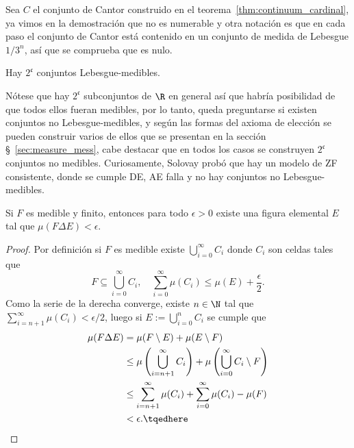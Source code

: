 \begin{exn}
	Sea $C$ el conjunto de Cantor construido en el teorema~\ref{thm:continuum_cardinal}, ya vimos en la demostración que no es numerable
	y otra notación es que en cada paso el conjunto de Cantor está contenido en un conjunto de medida de Lebesgue $1/3^n$, así que se comprueba que es nulo.
\end{exn}
\begin{cor}
	Hay $2^{\mathfrak{c}}$ conjuntos Lebesgue-medibles.
\end{cor}

Nótese que hay $2^{\mathfrak{c}}$ subconjuntos de $\R$ en general así que habría posibilidad de que todos ellos fueran medibles,
por lo tanto, queda preguntarse si existen conjuntos no Lebesgue-medibles, y según las formas del axioma de elección se pueden construir varios de ellos
que se presentan en la sección \S~\ref{sec:measure_mess}, cabe destacar que en todos los casos se construyen $2^{\mathfrak{c}}$ conjuntos no medibles.
Curiosamente, Solovay probó que hay un modelo de ZF consistente, donde se cumple DE, AE falla y no hay conjuntos no Lebesgue-medibles.

\begin{thmi}
	Si $F$ es medible y finito, entonces para todo $\epsilon > 0$ existe una figura elemental $E$ tal que $\mu(F\Delta E) < \epsilon$.
\end{thmi}
\begin{proof}
	Por definición si $F$ es medible existe $\bigcup_{i=0}^\infty C_i$ donde $C_i$ son celdas tales que
	$$ F \subseteq \bigcup_{i=0}^\infty C_i,\quad \sum_{i=0}^\infty \mu(C_i) \le \mu(E) + \frac\epsilon 2. $$
	Como la serie de la derecha converge, existe $n\in\N$ tal que $\sum_{i=n+1}^\infty\mu(C_i) < \epsilon/2$, luego si $E := \bigcup_{i=0}^n C_i$ se cumple que
	\begin{align}
		\mu(F\Delta E) &= \mu(F\setminus E) + \mu(E\setminus F) \notag \\
		&\le \mu\left( \bigcup_{i=n+1}^\infty C_i \right) + \mu\left( \bigcup_{i=0}^\infty C_i \setminus F \right) \notag \\
		&\le \sum_{i=n+1}^\infty \mu(C_i) + \sum_{i=0}^\infty \mu(C_i) - \mu(F) \notag \\
		&< \epsilon. \tqedhere
	\end{align}
\end{proof}

